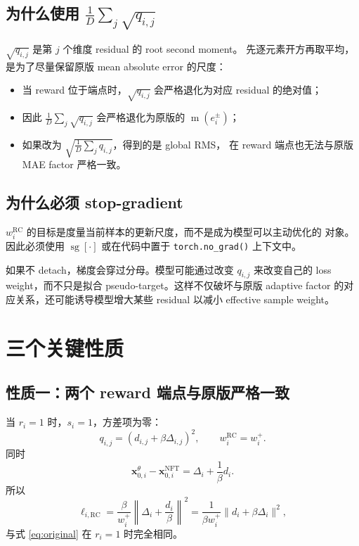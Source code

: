 \documentclass[11pt,a4paper]{article}
\newcommand{\sg}{\operatorname{sg}}
\newcommand{\mabs}{\operatorname{m}}
\newcommand{\xcur}{\mathbf{x}_{0,i}^{\theta}}
\newcommand{\xtarget}{\mathbf{x}_{0,i}^{\mathrm{NFT}}}
\newcommand{\R}{\mathrm{RC}}
\begin{document}
\subsection{为什么使用
\texorpdfstring{$\frac{1}{D}\sum_j\sqrt{q_{i,j}}$}{mean root-second-moment}}

$\sqrt{q_{i,j}}$ 是第 $j$ 个维度 residual 的 root second moment。
先逐元素开方再取平均，是为了尽量保留原版 mean absolute error 的尺度：
\begin{itemize}
  \item 当 reward 位于端点时，$\sqrt{q_{i,j}}$ 会严格退化为对应 residual
  的绝对值；
  \item 因此 $\frac{1}{D}\sum_j\sqrt{q_{i,j}}$ 会严格退化为原版的
  $\mabs(e_i^\pm)$；
  \item 如果改为 $\sqrt{\frac{1}{D}\sum_j q_{i,j}}$，得到的是 global RMS，
  在 reward 端点也无法与原版 MAE factor 严格一致。
\end{itemize}

\subsection{为什么必须 stop-gradient}

$w_i^{\R}$ 的目标是度量当前样本的更新尺度，而不是成为模型可以主动优化的
对象。因此必须使用 $\sg[\cdot]$ 或在代码中置于 \texttt{torch.no\_grad()}
上下文中。

如果不 detach，梯度会穿过分母。模型可能通过改变 $q_{i,j}$ 来改变自己的
loss weight，而不只是拟合 pseudo-target。这样不仅破坏与原版 adaptive
factor 的对应关系，还可能诱导模型增大某些 residual 以减小 effective
sample weight。

\section{三个关键性质}

\subsection{性质一：两个 reward 端点与原版严格一致}

当 $r_i=1$ 时，$s_i=1$，方差项为零：
\begin{equation}
q_{i,j}
=
\left(d_{i,j}+\beta\Delta_{i,j}\right)^2,
\qquad
w_i^{\R}=w_i^+.
\end{equation}
同时
\begin{equation}
\xcur-\xtarget
=
\Delta_i+\frac{1}{\beta}d_i.
\end{equation}
所以
\begin{equation}
\ell_{i,\R}
=
\frac{\beta}{w_i^+}
\left\|
\Delta_i+\frac{d_i}{\beta}
\right\|^2
=
\frac{1}{\beta w_i^+}
\|d_i+\beta\Delta_i\|^2,
\end{equation}
与式 \eqref{eq:original} 在 $r_i=1$ 时完全相同。
\end{document}
